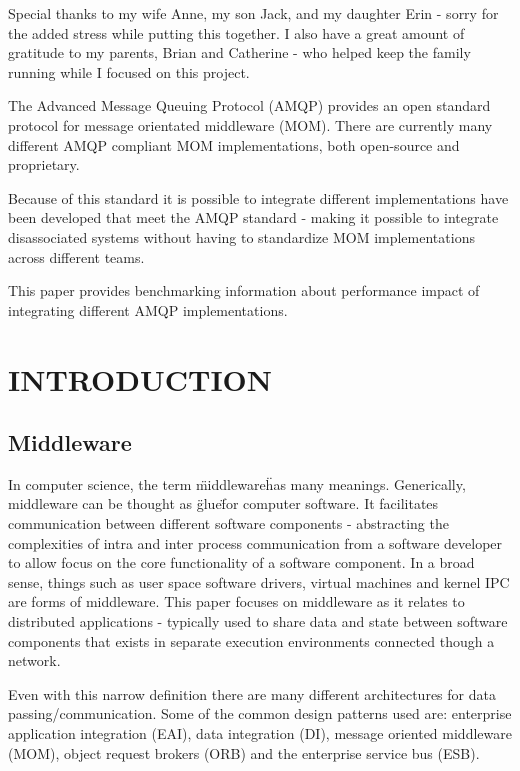 \documentclass{thesis}
\author{David Joe Wade}
\begin{document}
 
\listoftodos
\titlepage            	 %
\tableofcontents          %
\listoftables          	 %
\listoffigures         	 %

Special thanks to my wife Anne, my son Jack, and my daughter Erin - sorry for the added stress while putting this together.  I also have a great amount of gratitude to my parents, Brian and Catherine - who helped keep the family running while I focused on this project.

The Advanced Message Queuing Protocol (AMQP) provides an open standard protocol for message orientated middleware (MOM).  There are currently many different AMQP compliant MOM implementations, both open-source and proprietary.  

Because of this standard it is possible to integrate different implementations have been developed that meet the AMQP standard - making it possible to integrate disassociated systems without having to standardize MOM implementations across different teams.    

This paper provides benchmarking information about performance impact of integrating different AMQP implementations.  

\chapter{INTRODUCTION}

\section{Middleware}
In computer science, the term \"middleware\" has many meanings.  Generically, middleware can be thought as \"glue\"  for computer software.  It facilitates communication between different software components - abstracting the complexities of intra and inter process communication from a software developer to allow focus on the core functionality of a software component.  In a broad sense, things such as user space software drivers, virtual machines and kernel IPC are forms of middleware.  This paper focuses on middleware as it relates to distributed applications - typically used to share data and state between software components that exists in separate execution environments connected though a network.

Even with this narrow definition there are many different architectures for data passing/communication.  Some of the common design patterns used are: enterprise application integration (EAI), data integration (DI), message oriented middleware (MOM), object request brokers (ORB) and the enterprise service bus (ESB).  
\end{document}
